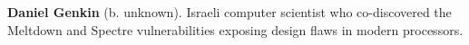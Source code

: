 \textbf{Daniel Genkin} (b. unknown). Israeli computer scientist who co-discovered the Meltdown and Spectre vulnerabilities exposing design flaws in modern processors.

